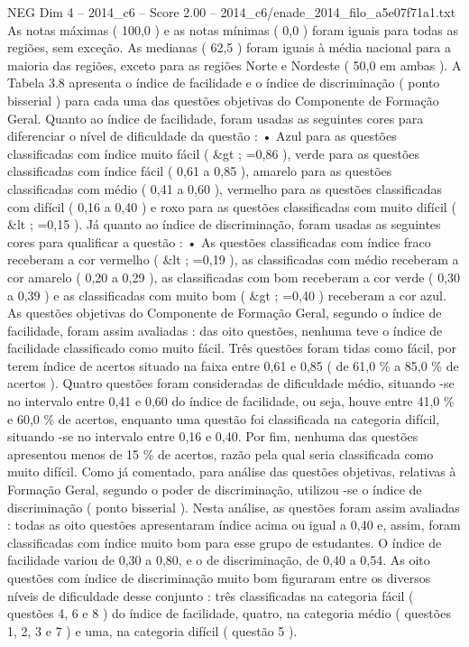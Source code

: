 \begin{textsample}{NEG Dim 4 – 2014\_c6 – Score 2.00 – 2014\_c6/enade\_2014\_filo\_a5e07f71a1.txt}
As notas máximas ( 100,0 ) e as notas mínimas ( 0,0 ) foram iguais para todas as regiões, sem exceção.
As medianas ( 62,5 ) foram iguais à média nacional para a maioria das regiões, exceto para as regiões Norte e Nordeste ( 50,0 em ambas ).
A Tabela 3.8 apresenta o índice de facilidade e o índice de discriminação ( ponto bisserial ) para cada uma das questões objetivas do Componente de Formação Geral.
Quanto ao índice de facilidade, foram usadas as seguintes cores para diferenciar o nível de dificuldade da questão : • Azul para as questões classificadas com índice muito fácil ( \&gt ; =0,86 ), verde para as questões classificadas com índice fácil ( 0,61 a 0,85 ), amarelo para as questões classificadas com médio ( 0,41 a 0,60 ), vermelho para as questões classificadas com difícil ( 0,16 a 0,40 ) e roxo para as questões classificadas com muito difícil ( \&lt ; =0,15 ).
Já quanto ao índice de discriminação, foram usadas as seguintes cores para qualificar a questão : • As questões classificadas com índice fraco receberam a cor vermelho ( \&lt ; =0,19 ), as classificadas com médio receberam a cor amarelo ( 0,20 a 0,29 ), as classificadas com bom receberam a cor verde ( 0,30 a 0,39 ) e as classificadas com muito bom ( \&gt ; =0,40 ) receberam a cor azul.
As questões objetivas do Componente de Formação Geral, segundo o índice de facilidade, foram assim avaliadas : das oito questões, nenhuma teve o índice de facilidade classificado como muito fácil.
Três questões foram tidas como fácil, por terem índice de acertos situado na faixa entre 0,61 e 0,85 ( de 61,0 \% a 85,0 \% de acertos ).
Quatro questões foram consideradas de dificuldade médio, situando -se no intervalo entre 0,41 e 0,60 do índice de facilidade, ou seja, houve entre 41,0 \% e 60,0 \% de acertos, enquanto uma questão foi classificada na categoria difícil, situando -se no intervalo entre 0,16 e 0,40.
Por fim, nenhuma das questões apresentou menos de 15 \% de acertos, razão pela qual seria classificada como muito difícil.
Como já comentado, para análise das questões objetivas, relativas à Formação Geral, segundo o poder de discriminação, utilizou -se o índice de discriminação ( ponto bisserial ).
Nesta análise, as questões foram assim avaliadas : todas as oito questões apresentaram índice acima ou igual a 0,40 e, assim, foram classificadas com índice muito bom para esse grupo de estudantes.
O índice de facilidade variou de 0,30 a 0,80, e o de discriminação, de 0,40 a 0,54.
As oito questões com índice de discriminação muito bom figuraram entre os diversos níveis de dificuldade desse conjunto : três classificadas na categoria fácil ( questões 4, 6 e 8 ) do índice de facilidade, quatro, na categoria médio ( questões 1, 2, 3 e 7 ) e uma, na categoria difícil ( questão 5 ).

\end{textsample}
